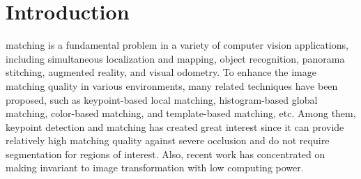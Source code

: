 
\section{Introduction}

% 
% 
% 
% 

 




 matching is a fundamental problem in a variety of computer vision applications, including simultaneous localization and mapping\cite{chang_p-slam:_2007,davison_monoslam:_2007}, object recognition\cite{nister_scalable_2006}, panorama stitching\cite{brown_recognising_2003,wagner_real-time_2010}, augmented reality\cite{klein_parallel_2007,wagner_multiple_2009}, and visual odometry\cite{cheng_visual_2006,nister_visual_2004}. To enhance the image matching quality in various environments, many related techniques have been proposed, such as keypoint-based local matching, histogram-based global matching\cite{le_improving_2013,goncalves_hairis:_2011}, color-based matching\cite{mehtre_color_1995,kankanhalli_cluster-based_1996}, and template-based matching\cite{korman_fast-match:_2013}, etc. Among them, keypoint detection and matching has created great interest since it can provide relatively high matching quality against severe occlusion and do not require segmentation for regions of interest. Also, recent work has concentrated on making invariant to image transformation with low computing power\cite{carrera_robust_2007,mikolajczyk_performance_2005}.


